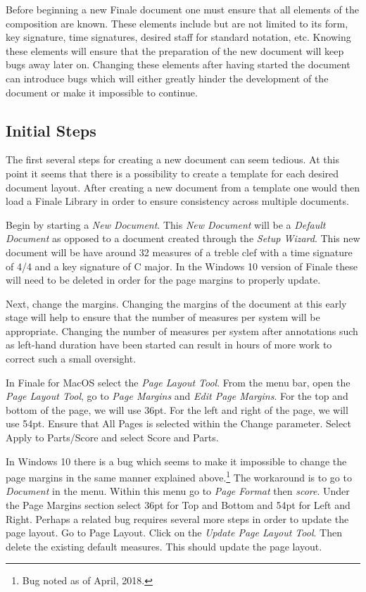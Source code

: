 \documentclass[]{memoir}
\begin{document}
Before beginning a new Finale document one must ensure that all
elements of the composition are known. These elements include but are
not limited to its form, key signature, time signatures, desired staff
for standard notation, etc. Knowing these elements will ensure that
the preparation of the new document will keep bugs away later
on. Changing these elements after having started the document can
introduce bugs which will either greatly hinder the development of the
document or make it impossible to continue.

\subsection{Initial Steps}
\label{sec:initial-steps}

The first several steps for creating a new document can seem
tedious. At this point it seems that there is a possibility to create
a template for each desired document layout. After creating a new
document from a template one would then load a Finale Library in order
to ensure consistency across multiple documents.

Begin by starting a \emph{New Document}. This \emph{New Document} will
be a \emph{Default Document} as opposed to a document created through
the \emph{Setup Wizard}. This new document will be have around 32
measures of a treble clef with a time signature of 4/4 and a key
signature of C major. In the Windows 10 version of Finale these will
need to be deleted in order for the page margins to properly update.

Next, change the margins. Changing the margins of the document at this
early stage will help to ensure that the number of measures per system
will be appropriate. Changing the number of measures per system after
annotations such as left-hand duration have been started can result in
hours of more work to correct such a small oversight.

In Finale for MacOS select the \emph{Page Layout Tool}. From the menu
bar, open the \emph{Page Layout Tool}, go to \emph{Page Margins} and
\emph{Edit Page Margins}. For the top and bottom of the page, we will
use 36pt. For the left and right of the page, we will use 54pt. Ensure
that All Pages is selected within the Change parameter. Select Apply
to Parts/Score and select Score and Parts.

In Windows 10 there is a bug which seems to make it impossible to
change the page margins in the same manner explained
above.\footnote{Bug noted as of April, 2018.} The workaround is to go
to \emph{Document} in the menu. Within this menu go to \emph{Page
  Format} then \emph{score}. Under the Page Margins section select
36pt for Top and Bottom and 54pt for Left and Right. Perhaps a related
bug requires several more steps in order to update the page layout. Go
to Page Layout. Click on the \emph{Update Page Layout Tool}. Then
delete the existing default measures. This should update the page
layout.
\end{document}
